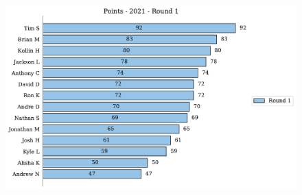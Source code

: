 \documentclass[10pt]{article}
\begin{document}
\begin{minipage}[t]{13cm}
    \begin{figure}[H]
        \vspace{-3.5cm}
        \includegraphics[width=12cm]{../../figures/2021/Points-2021-Round1.pdf}
    \end{figure}
\end{minipage}
\end{document}
